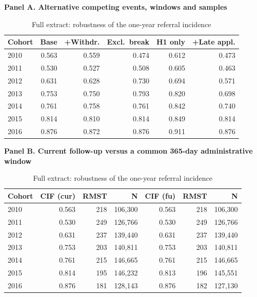 \begin{table}[htbp]\centering
\caption{Full extract: robustness of the one-year referral incidence}
\label{tab:P2rob}
\label{tab:P2fu}
\footnotesize
\par\medskip\textbf{Panel A. Alternative competing events, windows and samples}\par\smallskip
\begin{tabular}{lrrrrr}
\toprule
Cohort & Base & +Withdr. & Excl.\ break & H1 only & +Late appl. \\
\midrule
2010 & 0.563 & 0.559 & 0.474 & 0.612 & 0.473 \\
2011 & 0.530 & 0.527 & 0.508 & 0.605 & 0.463 \\
2012 & 0.631 & 0.628 & 0.730 & 0.694 & 0.571 \\
2013 & 0.753 & 0.750 & 0.793 & 0.820 & 0.698 \\
2014 & 0.761 & 0.758 & 0.761 & 0.842 & 0.740 \\
2015 & 0.814 & 0.810 & 0.814 & 0.849 & 0.814 \\
2016 & 0.876 & 0.872 & 0.876 & 0.911 & 0.876 \\
\bottomrule
\end{tabular}
\par\medskip\textbf{Panel B. Current follow-up versus a common 365-day administrative window}\par\smallskip
\begin{tabular}{lrrrrrr}
\toprule
Cohort & CIF (cur) & RMST & N & CIF (fu) & RMST & N \\
\midrule
2010 & 0.563 & 218 & 106,300 & 0.563 & 218 & 106,300 \\
2011 & 0.530 & 249 & 126,766 & 0.530 & 249 & 126,766 \\
2012 & 0.631 & 237 & 139,440 & 0.631 & 237 & 139,440 \\
2013 & 0.753 & 203 & 140,811 & 0.753 & 203 & 140,811 \\
2014 & 0.761 & 215 & 146,665 & 0.761 & 215 & 146,665 \\
2015 & 0.814 & 195 & 146,232 & 0.813 & 196 & 145,551 \\
2016 & 0.876 & 181 & 128,143 & 0.876 & 182 & 127,130 \\
\bottomrule
\end{tabular}
\end{table}
